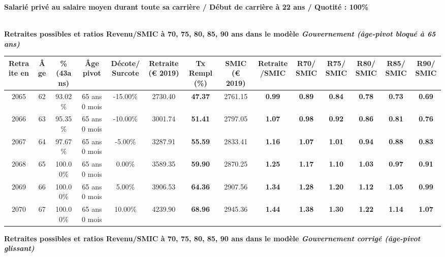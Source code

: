 {\bf \noindent Salarié privé au salaire moyen durant toute sa carrière / Début de carrière à 22 ans / Quotité : 100\%}  ~ 

 ~\\{\bf \noindent Retraites possibles et ratios Revenu/SMIC à 70, 75, 80, 85, 90 ans dans le modèle \emph{Gouvernement (âge-pivot bloqué à 65 ans)}}  
 
\begin{adjustbox}{max width=\textwidth} 
\begin{tabular}[htb]{|c|c||c|c|c||c|c||c|c||c|c|c|c|c|} 
\hline 
 Retraite en &  Âge &  \%(43ans) &  Âge pivot &  Décote/Surcote &  Retraite (\euro{} 2019) &  Tx Rempl(\%) &  SMIC (\euro{} 2019) &  Retraite/SMIC &  R70/SMIC &  R75/SMIC &  R80/SMIC &  R85/SMIC &  R90/SMIC \\ 
\hline \hline 
 2065 &  62 &  93.02\% &  65 ans 0 mois &  -15.00\% &  2730.40 &  {\bf 47.37} &  2761.15 &  {\bf {\color{red} 0.99}} &  {\bf {\color{red} 0.89}} &  {\bf {\color{red} 0.84}} &  {\bf {\color{red} 0.78}} &  {\bf {\color{red} 0.73}} &  {\bf {\color{red} 0.69}} \\ 
\hline 
 2066 &  63 &  95.35\% &  65 ans 0 mois &  -10.00\% &  3001.74 &  {\bf 51.41} &  2797.05 &  {\bf 1.07} &  {\bf {\color{red} 0.98}} &  {\bf {\color{red} 0.92}} &  {\bf {\color{red} 0.86}} &  {\bf {\color{red} 0.81}} &  {\bf {\color{red} 0.76}} \\ 
\hline 
 2067 &  64 &  97.67\% &  65 ans 0 mois &  -5.00\% &  3287.91 &  {\bf 55.59} &  2833.41 &  {\bf 1.16} &  {\bf 1.07} &  {\bf 1.01} &  {\bf {\color{red} 0.94}} &  {\bf {\color{red} 0.88}} &  {\bf {\color{red} 0.83}} \\ 
\hline 
 2068 &  65 &  100.00\% &  65 ans 0 mois &  0.00\% &  3589.35 &  {\bf 59.90} &  2870.25 &  {\bf 1.25} &  {\bf 1.17} &  {\bf 1.10} &  {\bf 1.03} &  {\bf {\color{red} 0.97}} &  {\bf {\color{red} 0.91}} \\ 
\hline 
 2069 &  66 &  100.00\% &  65 ans 0 mois &  5.00\% &  3906.53 &  {\bf 64.36} &  2907.56 &  {\bf 1.34} &  {\bf 1.28} &  {\bf 1.20} &  {\bf 1.12} &  {\bf 1.05} &  {\bf {\color{red} 0.99}} \\ 
\hline 
 2070 &  67 &  100.00\% &  65 ans 0 mois &  10.00\% &  4239.90 &  {\bf 68.96} &  2945.36 &  {\bf 1.44} &  {\bf 1.38} &  {\bf 1.30} &  {\bf 1.22} &  {\bf 1.14} &  {\bf 1.07} \\ 
\hline 
\hline 
\end{tabular} 
\end{adjustbox} 
 
 \vspace{0.1cm} 
{\bf \noindent Retraites possibles et ratios Revenu/SMIC à 70, 75, 80, 85, 90 ans dans le modèle \emph{Gouvernement corrigé (âge-pivot glissant)}}  
 
